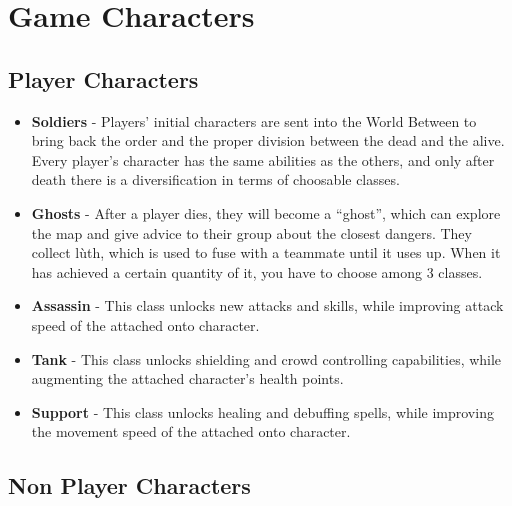 \documentclass[12pt]{article}
\begin{document}
\newpage

\section{Game Characters}

\subsection{Player Characters}

\begin{itemize}
	\item \textbf{Soldiers} - Players’ initial characters are sent into the World Between to bring back the order and the proper division between the dead and the alive. Every player’s character has the same abilities as the others, and only after death there is a diversification in terms of choosable classes.
	\item \textbf{Ghosts} - After a player dies, they will become a “ghost”, which can explore the map and give advice to their group about the closest dangers. They collect lùth, which is used to fuse with a teammate until it uses up. When it has achieved a certain quantity of it, you have to choose among 3 classes.
	\item \textbf{Assassin} - This class unlocks new attacks and skills, while improving attack speed of the attached onto character.
	\item \textbf{Tank} - This class unlocks shielding and crowd controlling capabilities, while augmenting the attached character’s health points.
	\item \textbf{Support} - This class unlocks healing and debuffing spells, while improving the movement speed of the attached onto character.
\end{itemize}

\subsection{Non Player Characters}
\end{document}
